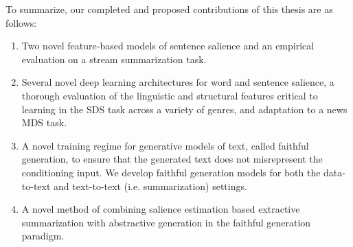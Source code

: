 To summarize, our completed and proposed contributions of this thesis are as 
follows:
\begin{enumerate}

 \item Two novel feature-based models of sentence salience and an empirical
    evaluation on a stream summarization task.


 \item Several novel deep learning architectures for word and sentence 
   salience, a thorough evaluation of the linguistic and
   structural features critical to learning in the SDS task across a 
   variety of genres, and adaptation to a news MDS task. 


 \item A novel training regime for generative models of text, 
     called faithful generation, to ensure that the generated text does
     not misrepresent the conditioning input. We develop faithful generation
     models for both the data-to-text and text-to-text (i.e. summarization)
     settings.

 \item A novel method of combining salience estimation based extractive 
     summarization with abstractive generation in the faithful generation
    paradigm.    




\end{enumerate}




